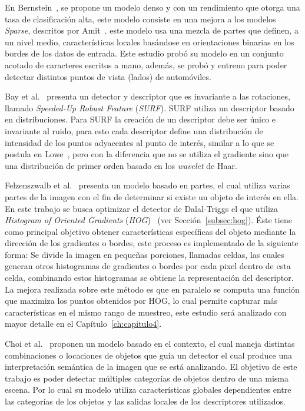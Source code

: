 En Bernstein~\cite{statistical2005}, se propone un modelo denso y con un rendimiento que otorga una tasa de clasificación alta, este modelo consiste en una mejora a los modelos \textit{Sparse}, descritos por Amit~\cite{Amit2002}. este modelo usa una mezcla de partes que definen, a un nivel medio, características locales basándose en orientaciones binarias en los bordes de los datos de entrada. Este estudio probó su modelo en un conjunto acotado de caracteres escritos a mano, además, se probó y entreno para poder detectar distintos puntos de vista (lados) de automóviles.

Bay et al.~\cite{surf2008} presenta un detector y descriptor que es invariante a las rotaciones, llamado \textit{Speeded-Up Robust Feature} (\textit{SURF}). SURF utiliza un descriptor basado en distribuciones. Para SURF la creación de un descriptor debe ser único e invariante al ruido, para esto cada descriptor define una distribución de intensidad de los puntos adyacentes al punto de interés, similar a lo que se postula en Lowe~\cite{sift2004}, pero con la diferencia que no se utiliza el gradiente sino que una distribución de primer orden basado en los \textit{wavelet} de Haar.

Felzenszwalb et al.~\cite{Felzenszwalb2010} presenta un modelo basado en partes,  el cual utiliza varias partes de la imagen con el fin de determinar si existe un objeto de interés en ella. En este trabajo se busca optimizar el detector de Dalal-Triggs el que utiliza \textit{Histogram of Oriented Gradients} (\textit{HOG})~\cite{hog2005} (ver Sección~\ref{subsec:hog}). Éste tiene como principal objetivo obtener características específicas del objeto mediante la dirección de los gradientes o bordes, este proceso es implementado de la siguiente forma: Se divide la imagen en pequeñas porciones, llamadas celdas, las cuales generan otros histogramas de gradientes o bordes por cada pixel dentro de esta celda, combinando estos histogramas se obtiene la representación del descriptor. La mejora realizada sobre este método es que en paralelo se computa una función que maximiza los puntos obtenidos por HOG\@, lo cual permite capturar más características en el mismo rango de muestreo, este estudio será analizado con mayor detalle en el Capítulo~\ref{ch:capitulo4}.

Choi et al.~\cite{treebased2012} proponen un modelo basado en el contexto, el cual maneja distintas combinaciones o locaciones de objetos que guía un detector el cual produce una interpretación semántica de la imagen que se está analizando. El objetivo de este trabajo es poder detectar múltiples categorías de objetos dentro de una misma escena. Por lo cual su modelo utiliza características globales dependientes entre las categorías de los objetos y las salidas locales de los descriptores utilizados.

